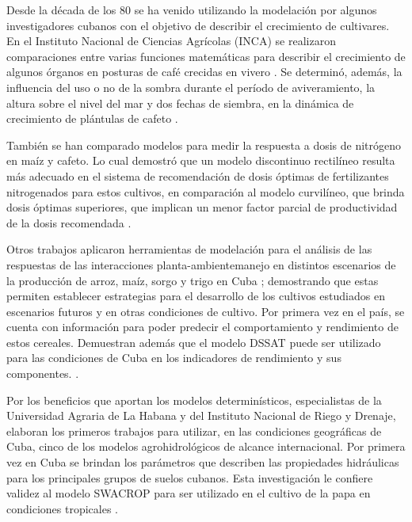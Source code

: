 Desde la década de los 80 se ha venido utilizando la modelación por algunos investigadores cubanos con el objetivo de describir el crecimiento de cultivares. En el Instituto Nacional de Ciencias Agrícolas (INCA) se realizaron comparaciones entre varias funciones matemáticas para describir el crecimiento de algunos órganos en posturas de café crecidas en vivero \parencite{soto1986crecimiento}. Se determinó, además, la influencia del uso o no de la sombra durante el período de aviveramiento, la altura sobre el nivel del mar y dos fechas de siembra, en la dinámica de crecimiento de plántulas de cafeto \parencite{soto1991dlnamlca, hernandez2009modelos, rodriguez2018aplicaciones}.

También se han comparado modelos para medir la respuesta a dosis de nitrógeno en maíz y cafeto. Lo cual demostró que un modelo discontinuo rectilíneo resulta más adecuado en el sistema de recomendación de dosis óptimas de fertilizantes nitrogenados para estos cultivos, en comparación al modelo curvilíneo, que brinda dosis óptimas superiores, que implican un menor factor parcial de productividad de la dosis recomendada \parencite{martin2016comparacion, rodriguez2018aplicaciones}.

Otros trabajos aplicaron herramientas de modelación para el análisis de las respuestas de las interacciones planta-ambientemanejo en distintos escenarios de la producción de arroz, maíz, sorgo y trigo en Cuba \parencite{hernandez2016utilizacion}; demostrando que estas permiten establecer estrategias para el desarrollo de los cultivos estudiados en escenarios futuros y en otras condiciones de cultivo. Por primera vez en el país, se cuenta con información para poder predecir el comportamiento y rendimiento de estos cereales. Demuestran además que el modelo DSSAT puede ser utilizado para las condiciones de Cuba en los indicadores de rendimiento y sus componentes. \parencite{rodriguez2018aplicaciones}.

Por los beneficios que aportan los modelos determinísticos, especialistas de la Universidad Agraria de La Habana y del Instituto Nacional de Riego y Drenaje, elaboran los primeros trabajos para utilizar, en las condiciones geográficas de Cuba, cinco de los modelos agrohidrológicos de alcance internacional. Por primera vez en Cuba se brindan los parámetros que describen las propiedades hidráulicas para los principales grupos de suelos cubanos. Esta investigación le confiere validez al modelo SWACROP para ser utilizado en el cultivo de la papa en condiciones tropicales \parencite{ruiz1997utilizacion, rodriguez2018aplicaciones}.

